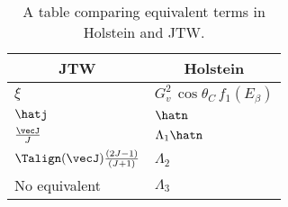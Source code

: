 


\renewcommand{\arraystretch}{1.6}

\begin{table}[h!!!!t]
	\begin{center}
	\begin{tabular}{ | l | l | }
		\multicolumn{1}{c}{JTW} 				& \multicolumn{1}{c}{Holstein}
		\\  \hline
		$\xi$    								& $G_v^2 \, \cos\theta_C \, f_1(E_\beta)$ 
		\\  \hline
		$\hatj$									& $\hatn$ 
		\\  \hline
		$\frac{\vecJ}{J}$ 						& $\Lambda_1\hatn $
		\\  \hline 
		$\Talign(\vecJ) \frac{(2J-1)}{(J+1)}$ 	& $\Lambda_2$
		\\  \hline 
		No equivalent							& $\Lambda_3$
		\\  \hline
	\end{tabular}
	\end{center}
	\caption[Notation Guide]{A table comparing equivalent terms in Holstein and JTW.}
	\label{table:compare_notation_nonotes}
\end{table}
